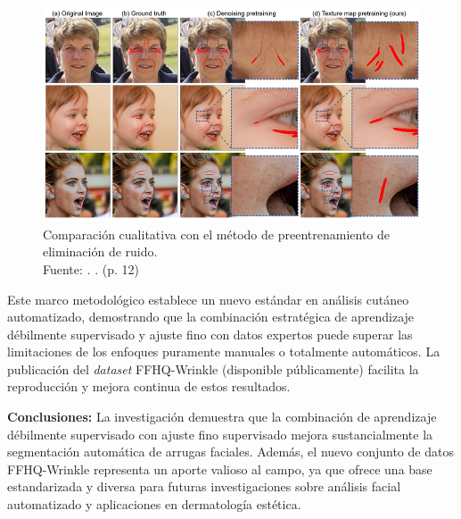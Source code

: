 \begin{figure}[H]
    \begin{center}
        \includegraphics[width=1\textwidth]{2/figures/resultant6.png}
        \caption[Comparación cualitativa con el método de preentrenamiento de eliminación de ruido]{Comparación cualitativa con el método de preentrenamiento de eliminación de ruido.\\
            Fuente: \cite{moon2024dermatology}. . (p. 12)}
        \label{2:resultsant6}
    \end{center}
\end{figure}

Este marco metodológico establece un nuevo estándar en análisis cutáneo automatizado, demostrando que la combinación estratégica de aprendizaje débilmente supervisado y ajuste fino con datos expertos puede superar las limitaciones de los enfoques puramente manuales o totalmente automáticos. La publicación del \textit{dataset} FFHQ-Wrinkle (disponible públicamente) facilita la reproducción y mejora continua de estos resultados.

\textbf{Conclusiones:}
La investigación demuestra que la combinación de aprendizaje débilmente supervisado con ajuste fino supervisado mejora sustancialmente la segmentación automática de arrugas faciales. Además, el nuevo conjunto de datos FFHQ-Wrinkle representa un aporte valioso al campo, ya que ofrece una base estandarizada y diversa para futuras investigaciones sobre análisis facial automatizado y aplicaciones en dermatología estética.
